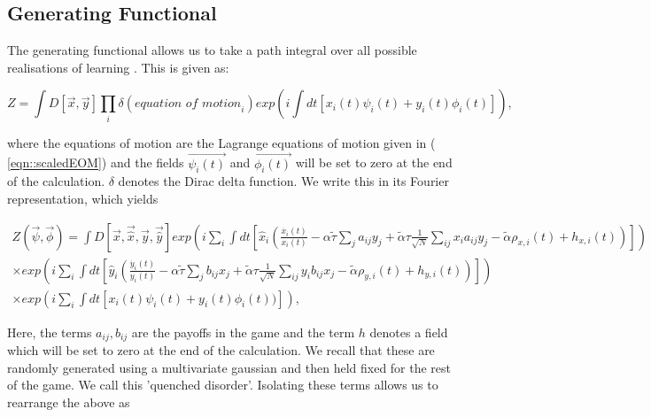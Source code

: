 \documentclass{article}
\begin{document}

	\subsection{Generating Functional} %
	\label{sub:generating_functional}
	
	The generating functional allows us to take a path integral over all possible realisations of
	learning \cite{SpinGlassTheory}. This is given as:

	\begin{equation}
		Z = \int D[\Vec{x}, \Vec{y}] \prod_i \delta(\textit{equation of motion}_i) exp(i
		\int dt[x_i(t) \psi_i(t) + y_i(t) \phi_i(t)]), 
	\end{equation}

	where the equations of motion are the Lagrange equations of motion given in (
	\ref{eqn::scaledEOM}) and
	the fields $\Vec{\psi_i(t)}$ and $\Vec{\phi_i(t)}$ will be set to zero at the end of the
	calculation. $\delta$ denotes the Dirac delta function. We write this in its Fourier
	representation, which yields	

	\begin{equation}
		\begin{split}
	\label{eqn::generatingfunctional}
		Z(\Vec{\psi}, \Vec{\phi}) = \int D[\Vec{x}, \Vec{\hat{x}}, \Vec{y}, \Vec{\hat{y}}] exp(i \sum_i \int dt[\hat{x}_i
		(\frac{\dot{x_i}(t)}{x_i(t)} - \alpha \tilde{\tau} \sum_{j} a_
			{ij} 
			y_j +
			\tilde{\alpha} \tau \frac{1}{\sqrt{N}} \sum_{i j} x_i a_{ij} y_j
			- \tilde{\alpha} \rho_{x, i}(t) + h_{x, i}(t))]) 
			\\
			\times exp(i \sum_i \int dt[\hat{y}_i
		(\frac{\dot{y_i}(t)}{y_i(t)} - \alpha \tilde{\tau} \sum_{j} b_
			{ij} 
			x_j +
			\tilde{\alpha} \tau \frac{1}{\sqrt{N}} \sum_{i j} y_i b_{ij} x_j
			- \tilde{\alpha} \rho_{y, i}(t)+ h_{y, i}(t))])\\
			\times exp(i \sum_i
		\int dt[x_i(t) \psi_i(t) + y_i(t) \phi_i(t))]),
	\end{split}
	\end{equation}

	Here, the terms $a_{ij}, b_{ij}$ are the payoffs in the game and the term $h$ denotes a field
	which will be set to zero at the end of the calculation. We recall that these are randomly
	generated using a multivariate gaussian and then held fixed for the rest of the game. We call
	this 'quenched disorder'. Isolating these terms allows us to rearrange the above as
\end{document}
